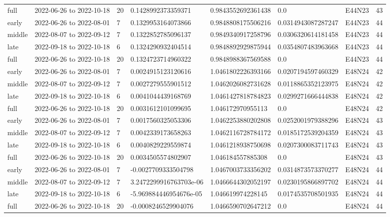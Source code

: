 \begin{longtable}{llllllll}
full & 2022-06-26 to 2022-10-18 & 20 & 0.1428992373359371 & 0.9843552692361438 & 0.0 & E44N23 & 43 \\
early & 2022-06-26 to 2022-08-01 & 7 & 0.1329953164073866 & 0.9848808175506216 & 0.0314943087287247 & E44N23 & 44 \\
middle & 2022-08-07 to 2022-09-12 & 7 & 0.1322852785096137 & 0.9849340917258796 & 0.0306320614181458 & E44N23 & 44 \\
late & 2022-09-18 to 2022-10-18 & 6 & 0.1324290932404514 & 0.9848892929875944 & 0.0354807483963668 & E44N23 & 44 \\
full & 2022-06-26 to 2022-10-18 & 20 & 0.1324723714960322 & 0.9848988367569588 & 0.0 & E44N23 & 44 \\
early & 2022-06-26 to 2022-08-01 & 7 & 0.0024915123120616 & 1.0461802226393166 & 0.0207194597460329 & E48N24 & 42 \\
middle & 2022-08-07 to 2022-09-12 & 7 & 0.0027279555901512 & 1.0462026082731628 & 0.0118865352123975 & E48N24 & 42 \\
late & 2022-09-18 to 2022-10-18 & 6 & 0.0041044439168769 & 1.0461427818784823 & 0.0299271666444838 & E48N24 & 42 \\
full & 2022-06-26 to 2022-10-18 & 20 & 0.0031612101099695 & 1.046172970955113 & 0.0 & E48N24 & 42 \\
early & 2022-06-26 to 2022-08-01 & 7 & 0.0017560325053306 & 1.0462253880202808 & 0.0252001979388296 & E48N24 & 43 \\
middle & 2022-08-07 to 2022-09-12 & 7 & 0.0042339173658263 & 1.0462116728784172 & 0.0185172539204359 & E48N24 & 43 \\
late & 2022-09-18 to 2022-10-18 & 6 & 0.0040829229559874 & 1.0461218938750698 & 0.0207300083711743 & E48N24 & 43 \\
full & 2022-06-26 to 2022-10-18 & 20 & 0.0034505574802907 & 1.046184557885308 & 0.0 & E48N24 & 43 \\
early & 2022-06-26 to 2022-08-01 & 7 & -0.0027709333504798 & 1.0467003733356202 & 0.0314873573370277 & E48N24 & 44 \\
middle & 2022-08-07 to 2022-09-12 & 7 & 3.2472299916763703e-06 & 1.0466644302052197 & 0.0230195866897702 & E48N24 & 44 \\
late & 2022-09-18 to 2022-10-18 & 6 & -5.969884446954676e-05 & 1.046619974228145 & 0.0174535708501935 & E48N24 & 44 \\
full & 2022-06-26 to 2022-10-18 & 20 & -0.0008246529904076 & 1.0466590702647212 & 0.0 & E48N24 & 44 \\

\end{longtable}
